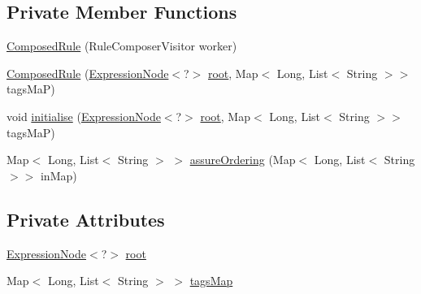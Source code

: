 \subsection*{Private Member Functions}
\begin{DoxyCompactItemize}
\item 
\hyperlink{classit_1_1emarolab_1_1cagg_1_1core_1_1language_1_1syntax_1_1expressionTree_1_1ExpressionNode_3_85122d0a00e50139778c858e32d721ce_a21c1f05adbaf7e04954e04501ae87b56}{Composed\-Rule} (Rule\-Composer\-Visitor worker)
\item 
\hyperlink{classit_1_1emarolab_1_1cagg_1_1core_1_1language_1_1syntax_1_1expressionTree_1_1ExpressionNode_3_85122d0a00e50139778c858e32d721ce_ae2e42d3033de9f7c778ae5af19d59dbb}{Composed\-Rule} (\hyperlink{classit_1_1emarolab_1_1cagg_1_1core_1_1language_1_1syntax_1_1expressionTree_1_1ExpressionNode_3_3eaf7c0f6a4bc47f4823e05ca883c5af_acfac8736e19e954def3e135de75d668e}{Expression\-Node}$<$?$>$ \hyperlink{classit_1_1emarolab_1_1cagg_1_1core_1_1language_1_1syntax_1_1expressionTree_1_1ExpressionNode_3_85122d0a00e50139778c858e32d721ce_ae8db56469bd689ec387d1ef67fd234d4}{root}, Map$<$ Long, List$<$ String $>$$>$ tags\-Ma\-P)
\item 
void \hyperlink{classit_1_1emarolab_1_1cagg_1_1core_1_1language_1_1syntax_1_1expressionTree_1_1ExpressionNode_3_85122d0a00e50139778c858e32d721ce_a02587dfdc61ae172df0a7f3f475cca4f}{initialise} (\hyperlink{classit_1_1emarolab_1_1cagg_1_1core_1_1language_1_1syntax_1_1expressionTree_1_1ExpressionNode_3_3eaf7c0f6a4bc47f4823e05ca883c5af_acfac8736e19e954def3e135de75d668e}{Expression\-Node}$<$?$>$ \hyperlink{classit_1_1emarolab_1_1cagg_1_1core_1_1language_1_1syntax_1_1expressionTree_1_1ExpressionNode_3_85122d0a00e50139778c858e32d721ce_ae8db56469bd689ec387d1ef67fd234d4}{root}, Map$<$ Long, List$<$ String $>$$>$ tags\-Ma\-P)
\item 
Map$<$ Long, List$<$ String $>$ $>$ \hyperlink{classit_1_1emarolab_1_1cagg_1_1core_1_1language_1_1syntax_1_1expressionTree_1_1ExpressionNode_3_85122d0a00e50139778c858e32d721ce_a6d0233ac0ba3cfd6f39b96aac0a5415d}{assure\-Ordering} (Map$<$ Long, List$<$ String $>$$>$ in\-Map)
\end{DoxyCompactItemize}
\subsection*{Private Attributes}
\begin{DoxyCompactItemize}
\item 
\hyperlink{classit_1_1emarolab_1_1cagg_1_1core_1_1language_1_1syntax_1_1expressionTree_1_1ExpressionNode_3_3eaf7c0f6a4bc47f4823e05ca883c5af_acfac8736e19e954def3e135de75d668e}{Expression\-Node}$<$?$>$ \hyperlink{classit_1_1emarolab_1_1cagg_1_1core_1_1language_1_1syntax_1_1expressionTree_1_1ExpressionNode_3_85122d0a00e50139778c858e32d721ce_ae8db56469bd689ec387d1ef67fd234d4}{root}
\item 
Map$<$ Long, List$<$ String $>$ $>$ \hyperlink{classit_1_1emarolab_1_1cagg_1_1core_1_1language_1_1syntax_1_1expressionTree_1_1ExpressionNode_3_85122d0a00e50139778c858e32d721ce_a129357fc49da1f9870f54098f796bf93}{tags\-Map}
\end{DoxyCompactItemize}


